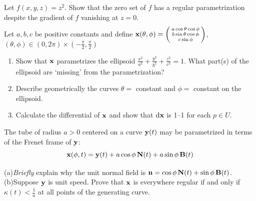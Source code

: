 \begin{exercises}
\begin{enumerate}
	
  \item Let $f(x,y,z)=z^2$. Show that the zero set of $f$ has a regular parametrization despite  the gradient of $f$ vanishing at $z=0$.
  
	
	\item Let $a,b,c$ be positive constants and define ${\mathbf{x}}(\theta,\phi)=\smash{\left(\begin{smallmatrix}a\cos\theta\cos\phi\\b\sin\theta\cos\phi\\c\sin\phi\end{smallmatrix}\right)}$, $(\theta,\phi)\in(0,2\pi)\times(-\frac\pi 2,\frac\pi 2)$
	\begin{enumerate}
		\item Show that ${\mathbf{x}}$ parametrizes the ellipsoid $\frac{x^2}{a^2}+\frac{y^2}{b^2}+\frac{z^2}{c^2}=1$.	What part(s) of the ellipsoid are `missing' from the parametrization?
		\item Describe geometrically the curves $\theta=\,\,$constant and $\phi=\,\,$constant on the ellipsoid.
		\item Calculate the differential of ${\mathbf{x}}$ and show that $\mathrm{d}{\mathbf{x}}$ is 1--1 for each $p\in U$.
	\end{enumerate}
	
	
	
	
	\begin{minipage}[t]{0.75\linewidth}\vspace{-5pt}
	\item The tube of radius $a>0$ centered on a curve ${\mathbf{y}}(t)$ may be parametrized in terms of the Frenet frame of ${\mathbf{y}}$:
	\[{\mathbf{x}}(\phi,t)={\mathbf{y}}(t)+a\cos\phi\,{\mathbf{N}}(t)+a\sin\phi\,{\mathbf{B}}(t)\]\par
	\lstsp(a)\lstsp\hangindent\leftmarginii \emph{Briefly} explain why the unit normal field is ${\mathbf{n}}=\cos\phi\,{\mathbf{N}}(t)+\sin\phi\,{\mathbf{B}}(t)$.\smallbreak
    \lstsp(b)\lstsp\hangindent\leftmarginii Suppose ${\mathbf{y}}$ is unit speed. Prove that ${\mathbf{x}}$ is everywhere regular if and only if $\kappa(t)<\frac 1a$ at all points of the generating curve.
    

\end{minipage}
\end{enumerate}
\end{exercises}
